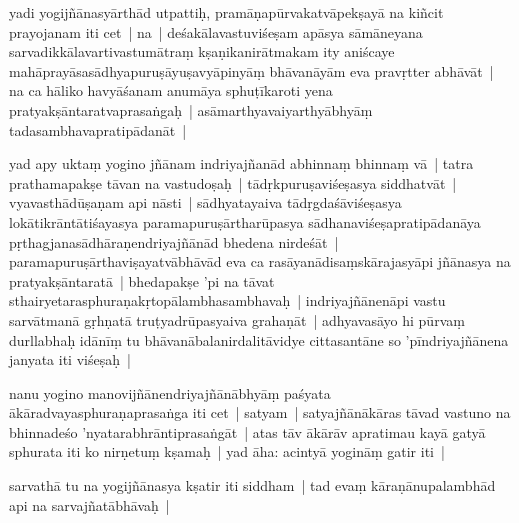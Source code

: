 \documentclass[article,12pt,a4paper]{memoir}%
\newcounter{parCount}
\begin{document}
	  
	  \pstart \leavevmode%
	\label{thakur75-22.22}yadi yogijñānasyārthād utpattiḥ, pramāṇapūrvakatvāpekṣayā na kiñcit prayojanam iti cet | na | deśakālavastuviśeṣam apāsya sāmāneyana sarvadikkālavartivastumātraṃ kṣaṇikanirātmakam ity aniścaye mahāprayāsasādhyapuruṣāyuṣavyāpinyāṃ bhāvanāyām eva pravṛtter abhāvāt | na ca hāliko havyāśanam anumāya sphuṭīkaroti yena pratyakṣāntaratvaprasaṅgaḥ | asāmarthyavaiyarthyābhyāṃ tadasambhavapratipādanāt | 
	{}
	\pend%
      

	  
	  \pstart \leavevmode%
	\label{thakur75-22.27}yad apy uktaṃ yogino jñānam indriyajñanād abhinnaṃ bhinnaṃ vā | tatra prathamapakṣe tāvan na vastudoṣaḥ | tādṛkpuruṣaviśeṣasya siddhatvāt | vyavasthādūṣaṇam api nāsti | sādhyatayaiva tādṛgdaśāviśeṣasya lokātikrāntātiśayasya paramapuruṣārtharūpasya sādhanaviśeṣapratipādanāya pṛthagjanasādhāraṇendriyajñānād bhedena nirdeśāt | paramapuruṣārthaviṣayatvābhāvād eva ca rasāyanādisaṃskārajasyāpi jñānasya na pratyakṣāntaratā | bhedapakṣe 'pi na tāvat sthairyetarasphuraṇakṛtopālambhasambhavaḥ | indriyajñānenāpi vastu sarvātmanā gṛhṇatā truṭyadrūpasyaiva grahaṇāt | adhyavasāyo hi pūrvaṃ durllabhaḥ idānīṃ tu bhāvanābalanirdalitāvidye cittasantāne so 'pīndriyajñānena janyata iti viśeṣaḥ | 
	{}
	\pend%
      

	  
	  \pstart \leavevmode%
	\label{thakur75-23.3}nanu yogino manovijñānendriyajñānābhyāṃ paśyata ākāradvayasphuraṇaprasaṅga iti cet | satyam | satyajñānākāras tāvad vastuno na bhinnadeśo 'nyatarabhrāntiprasaṅgāt | atas tāv ākārāv apratimau kayā gatyā sphurata iti ko nirṇetuṃ kṣamaḥ | yad āha: acintyā yogināṃ gatir iti |
	{}
	\pend%
      

	  
	  \pstart \leavevmode%
	\label{thakur75-23.7}sarvathā tu na yogijñānasya kṣatir iti siddham | tad evaṃ kāraṇānupalambhād api na sarvajñatābhāvaḥ | 
	{}
	\pend%
      
\end{document}
